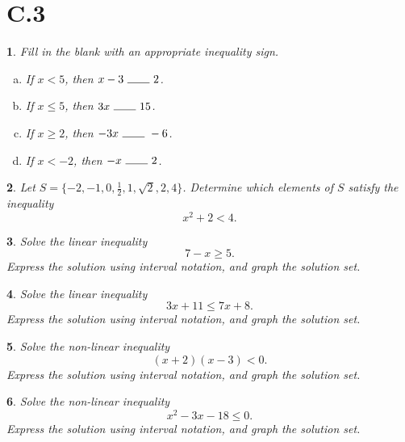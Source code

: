 \documentclass[12pt]{amsart}
\newtheorem{thm}{}
\begin{document}
\section*{C.3}

\setcounter{thm}{0}
\begin{thm}
  Fill in the blank with an appropriate inequality sign.
  \begin{enumerate}[(a)]
  \item
    If $x < 5$, then $x - 3\ \line(1,0){20}\ 2$.
  \item
    If $x \leq 5$, then $3x\ \line(1,0){20}\ 15$.
  \item
    If $x \geq 2$, then $-3x\ \line(1,0){20}\ -6$.
  \item
    If $x < -2$, then $-x\ \line(1,0){20}\ 2$.
  \end{enumerate}
\end{thm}

\setcounter{thm}{9}
\begin{thm}
  Let $S = \{-2, -1, 0, \frac{1}{2}, 1, \sqrt{2}, 2, 4\}$.
  Determine which elements of $S$ satisfy the inequality
  $$x^2 + 2 < 4.$$
\end{thm}

\setcounter{thm}{14}
\begin{thm}
  Solve the linear inequality
  $$7 - x \geq 5.$$
  Express the solution using interval notation, and graph the solution set.
\end{thm}

\setcounter{thm}{16}
\begin{thm}
  Solve the linear inequality
  $$3x + 11 \leq 7x + 8.$$
  Express the solution using interval notation, and graph the solution set.
\end{thm}

\setcounter{thm}{22}
\begin{thm}
  Solve the non-linear inequality
  $$(x + 2)(x - 3) < 0.$$
  Express the solution using interval notation, and graph the solution set.
\end{thm}

\setcounter{thm}{24}
\begin{thm}
  Solve the non-linear inequality
  $$x^2 - 3x - 18 \leq 0.$$
  Express the solution using interval notation, and graph the solution set.  
\end{thm}
\end{document}
